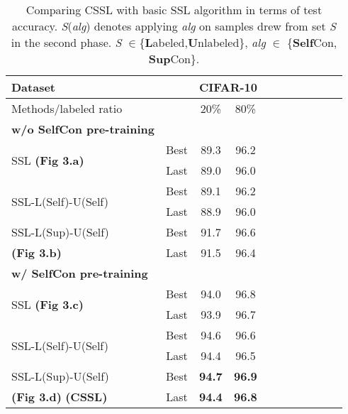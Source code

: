 \documentclass[letterpaper]{article} \usepackage{aaai22}  \usepackage{times}  \usepackage{helvet}  \usepackage{courier}  \usepackage[hyphens]{url}  \usepackage{graphicx} \usepackage{subfigure}
\begin{document}
\begin{table}[h]
\begin{center}
\begin{tabular}{lcccccccccc}
\hline
Dataset & & \multicolumn{2}{c}{CIFAR-10} \\
\hline
Methods/labeled ratio & & 20\% & 80\%  \\
\hline
\textbf{w/o SelfCon pre-training} \\
\hline
\multirow{2}{*}{SSL \textbf{(Fig 3.a)}} & Best & 89.3 & 96.2 \\
& Last & 89.0 & 96.0 \\
\hline
\multirow{2}{*}{SSL-L(Self)-U(Self)} & Best & 89.1 & 96.2 \\
& Last & 88.9 & 96.0 \\
\hline
SSL-L(Sup)-U(Self) & Best & 91.7 & 96.6 \\
\textbf{(Fig 3.b)}& Last & 91.5 & 96.4 \\
\hline
\textbf{w/ SelfCon pre-training} \\
\hline
\multirow{2}{*}{SSL \textbf{(Fig 3.c)}} & Best & 94.0 & 96.8 \\
& Last & 93.9 & 96.7 \\
\hline
\multirow{2}{*}{SSL-L(Self)-U(Self)} & Best & 94.6 & 96.6 \\
& Last & 94.4 & 96.5 \\
\hline
SSL-L(Sup)-U(Self) & Best & \textbf{94.7} & \textbf{96.9} \\
\textbf{(Fig 3.d)} \textbf{(CSSL)}& Last & \textbf{94.4} & \textbf{96.8} \\
\hline
\end{tabular}
\end{center}
\caption{Comparing CSSL with basic SSL algorithm in terms of test accuracy. \textit{S}(\textit{alg}) denotes applying \textit{alg} on samples drew from set \textit{S} in the second phase. \textit{S} $\in$\{\textbf{L}abeled,\textbf{U}nlabeled\}, \textit{alg} $\in$ \{\textbf{Self}Con, \textbf{Sup}Con\}. }
\label{tab:table1}
\end{table}
\end{document}
